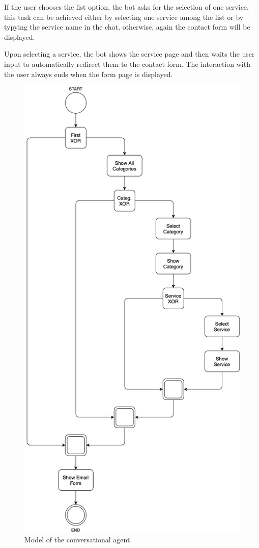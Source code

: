 \documentclass[12pt]{report}
\begin{document}
\bigbreak
\noindent
If the user chooses the fist option, the bot asks for the selection of one service, this task can be achieved either by selecting one service among the list 
or by typying the service name in the chat, otherwise, again the contact form will be displayed.

\bigbreak
\noindent
Upon selecting a service, the bot shows the service page and then waits the user input to automatically redirect them to the contact form. The interaction with the user always ends 
when the form page is displayed.

\begin{figure}[h]
	\centering
	\includegraphics[height=0.9\textheight]{model.png}
	\caption{Model of the conversational agent.}
	\label{fig:model}
\end{figure}
\end{document}

